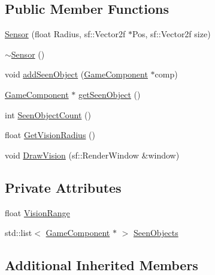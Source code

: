 \subsection*{Public Member Functions}
\begin{DoxyCompactItemize}
\item 
\hyperlink{class_sensor_ac404bb7c1045796220e6d2997231feec}{Sensor} (float Radius, sf\-::\-Vector2f $\ast$Pos, sf\-::\-Vector2f size)
\item 
\hyperlink{class_sensor_aee8c70e7ef05ce65e7ee33686b5d7db2}{$\sim$\-Sensor} ()
\item 
void \hyperlink{class_sensor_a10dcb96d63d3991eff95b47f626d0e4c}{add\-Seen\-Object} (\hyperlink{class_game_component}{Game\-Component} $\ast$comp)
\item 
\hyperlink{class_game_component}{Game\-Component} $\ast$ \hyperlink{class_sensor_ac707ee7af9bd9adcdcb17d126582cc14}{get\-Seen\-Object} ()
\item 
int \hyperlink{class_sensor_ade01c8ff6de8daec5755b39bf4a57eae}{Seen\-Object\-Count} ()
\item 
float \hyperlink{class_sensor_ab7cc277606b8709a6df5fc53d7c0f22b}{Get\-Vision\-Radius} ()
\item 
void \hyperlink{class_sensor_a8ed4309852c92cdeac0152cc2f604ac8}{Draw\-Vision} (sf\-::\-Render\-Window \&window)
\end{DoxyCompactItemize}
\subsection*{Private Attributes}
\begin{DoxyCompactItemize}
\item 
float \hyperlink{class_sensor_af509a7308626a219e017f07c0d25a78f}{Vision\-Range}
\item 
std\-::list$<$ \hyperlink{class_game_component}{Game\-Component} $\ast$ $>$ \hyperlink{class_sensor_a3ed58c2bc9140a884ce86014fbfd6926}{Seen\-Objects}
\end{DoxyCompactItemize}
\subsection*{Additional Inherited Members}



